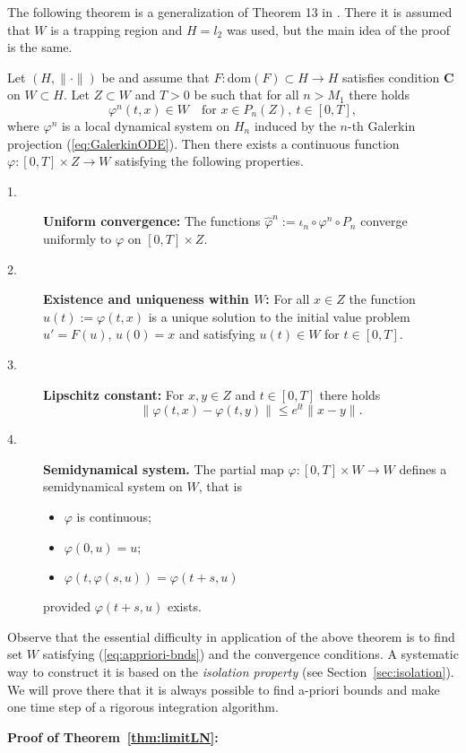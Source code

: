 The following theorem is a generalization of  Theorem 13 in \cite{Z}. There   it is assumed that  $W$ is a trapping region and  $H=l_2$ was used, but  the main idea of the proof is the same.
\begin{theorem}
\label{thm:limitLN}
 Let $(H,\|\cdot\|)$ be \gss and assume that $F:\mathrm{dom}(F)\subset H \to H$ satisfies condition \textbf{C} on $W\subset H$. Let $Z\subset W$ and $T>0$ be such that for all $n>M_1$ there holds
  \begin{equation}
    \varphi^n(t,x)\in W\quad \text{for } x\in P_n(Z),\ t\in[0,T], \label{eq:appriori-bnds}
  \end{equation}
  where $\varphi^n$ is a local dynamical system on $H_n$ induced by the $n$-th Galerkin projection (\ref{eq:GalerkinODE}). Then there exists a continuous function $\varphi\colon[0,T]\times Z\to W$ satisfying the following properties.
    \begin{description}
    \item[1.]{\bf Uniform convergence:} The functions $\widehat{\varphi}^n:=\iota_n\circ \varphi^n\circ P_n$ converge uniformly to $\varphi$ on $[0,T]\times Z$.
    \item[2.] {\bf Existence and uniqueness within $W$:} For all $x\in Z$ the function $u(t):=\varphi(t,x)$ is a unique solution to the initial value problem $u'=F(u)$, $u(0)=x$ and satisfying $u(t)\in W$ for $t\in[0,T]$.
    \item[3.]  {\bf Lipschitz constant:} For $x,y\in Z$ and $t\in[0,T]$ there holds
      \begin{equation*}
         \|\varphi(t,x) - \varphi(t,y) \| \leq e^{lt}\|x - y\|.%
      \end{equation*}
    \item[4.] {\bf Semidynamical system.} The partial map $\varphi:[0,T] \times W \to W$ defines a semidynamical system on $W$, that is
        \begin{itemize}
          \item $\varphi$ is continuous;
          \item $\varphi(0,u)=u$;
          \item $\varphi(t,\varphi(s,u)) = \varphi(t+s,u)$
        \end{itemize}
    provided $\varphi(t+s,u)$ exists.
  \end{description}
\end{theorem}
\begin{remark}
Observe that the essential difficulty in application of the above theorem is to find set $W$ satisfying (\ref{eq:appriori-bnds}) and the convergence conditions. A systematic way to construct it is based on the \emph{isolation property} (see Section~\ref{sec:isolation}). We will prove there that it is always possible to find a-priori bounds and make one time step of a rigorous integration algorithm.
\end{remark}
\noindent
\textbf{Proof of Theorem~\ref{thm:limitLN}:}

